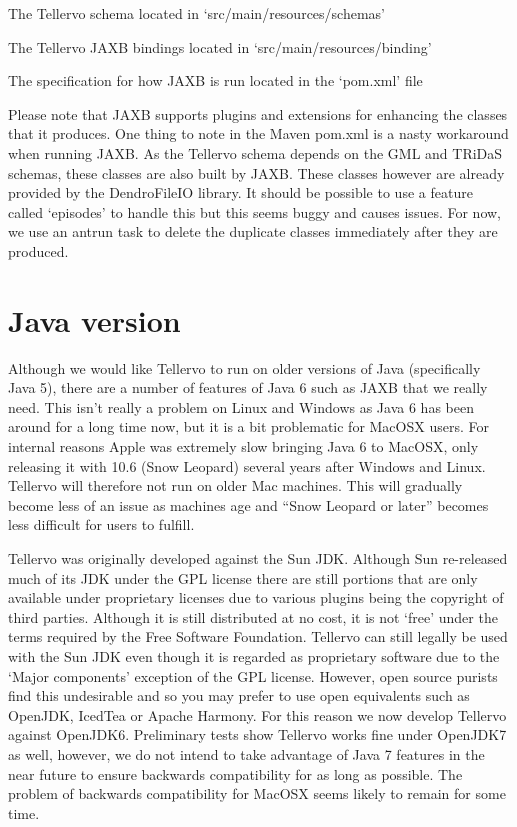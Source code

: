 \begin{itemize*}
 \item The Tellervo schema located in `src/main/resources/schemas'
 \item The Tellervo JAXB bindings located in `src/main/resources/binding'
 \item The specification for how JAXB is run located in the `pom.xml' file
\end{itemize*}

Please note that JAXB supports plugins and extensions for enhancing the classes that it produces.  One thing to note in the Maven pom.xml is a nasty workaround when running JAXB.  As the Tellervo schema depends on the GML and TRiDaS schemas, these classes are also built by JAXB.  These classes however are already provided by the DendroFileIO library.  It should be possible to use a feature called `episodes' to handle this but this seems buggy and causes issues.  For now, we use an antrun task to delete the duplicate classes immediately after they are produced.


\section{Java version}
\label{txt:java}
Although we would like Tellervo to run on older versions of Java (specifically Java 5), there are a number of features of Java 6 such as JAXB that we really need.  This isn't really a problem on Linux and Windows as Java 6 has been around for a long time now, but it is a bit problematic for MacOSX users.  For internal reasons Apple was extremely slow bringing Java 6 to MacOSX, only releasing it with 10.6 (Snow Leopard) several years after Windows and Linux.  Tellervo will therefore not run on older Mac machines.  This will gradually become less of an issue as machines age and ``Snow Leopard or later'' becomes less difficult for users to fulfill.  

Tellervo was originally developed against the Sun JDK.  Although Sun re-released much of its JDK under the GPL license there are still portions that are only available under proprietary licenses due to various plugins being the copyright of third parties.  Although it is still distributed at no cost, it is not `free' under the terms required by the Free Software Foundation.  Tellervo can still legally be used with the Sun JDK even though it is regarded as proprietary software due to the `Major components' exception of the GPL license.  However, open source purists find this undesirable and so you may prefer to use open equivalents such as OpenJDK, IcedTea or Apache Harmony.   For this reason we now develop Tellervo against OpenJDK6.  Preliminary tests show Tellervo works fine under OpenJDK7 as well, however, we do not intend to take advantage of Java 7 features in the near future to ensure backwards compatibility for as long as possible.  The problem of backwards compatibility for MacOSX seems likely to remain for some time.


